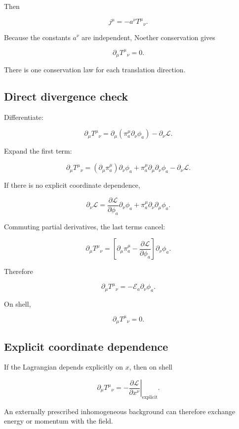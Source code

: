 Then

\[
j^{\mu}
=
-a^{\nu}T^{\mu}{}_{\nu}.
\]

Because the constants \(a^{\nu}\) are independent, Noether conservation gives

\[
\boxed{
\partial_{\mu}T^{\mu}{}_{\nu}=0
}.
\]

There is one conservation law for each translation direction.

\subsection{Direct divergence check}

Differentiate:

\[
\partial_{\mu}T^{\mu}{}_{\nu}
=
\partial_{\mu}
\left(
\pi_a^{\mu}\partial_{\nu}\phi_a
\right)
-
\partial_{\nu}\mathcal{L}.
\]

Expand the first term:

\[
\partial_{\mu}T^{\mu}{}_{\nu}
=
\left(
\partial_{\mu}\pi_a^{\mu}
\right)
\partial_{\nu}\phi_a
+
\pi_a^{\mu}
\partial_{\mu}\partial_{\nu}\phi_a
-
\partial_{\nu}\mathcal{L}.
\]

If there is no explicit coordinate dependence,

\[
\partial_{\nu}\mathcal{L}
=
\frac{\partial\mathcal{L}}
{\partial\phi_a}
\partial_{\nu}\phi_a
+
\pi_a^{\mu}
\partial_{\nu}\partial_{\mu}\phi_a.
\]

Commuting partial derivatives, the last terms cancel:

\[
\partial_{\mu}T^{\mu}{}_{\nu}
=
\left[
\partial_{\mu}\pi_a^{\mu}
-
\frac{\partial\mathcal{L}}
{\partial\phi_a}
\right]
\partial_{\nu}\phi_a.
\]

Therefore

\[
\boxed{
\partial_{\mu}T^{\mu}{}_{\nu}
=
-\mathcal{E}_a
\partial_{\nu}\phi_a
}.
\]

On shell,

\[
\partial_{\mu}T^{\mu}{}_{\nu}=0.
\]

\subsection{Explicit coordinate dependence}

If the Lagrangian depends explicitly on \(x\), then on shell

\[
\boxed{
\partial_{\mu}T^{\mu}{}_{\nu}
=
-
\left.
\frac{\partial\mathcal{L}}
{\partial x^{\nu}}
\right|_{\mathrm{explicit}}
}.
\]

An externally prescribed inhomogeneous background can therefore exchange energy or momentum with the field.

